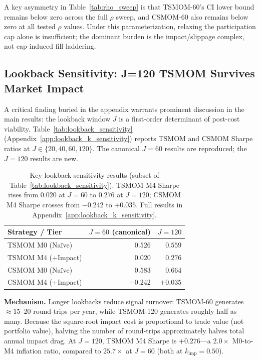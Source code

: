 \documentclass[12pt]{article}
\newcommand{\kimp}{k_{\mathrm{imp}}}
\begin{document}
A key asymmetry in Table~\ref{tab:rho_sweep} is that TSMOM-60's CI
lower bound remains below zero across the full $\rho$ sweep, and CSMOM-60
also remains below zero at all tested $\rho$ values. Under this
parameterization, relaxing the participation cap alone is insufficient;
the dominant burden is the impact/slippage complex, not cap-induced
fill laddering.

\subsection{Lookback Sensitivity: J=120 TSMOM Survives Market Impact}
\label{sec:lookback_main}

A critical finding buried in the appendix warrants prominent discussion
in the main results: the lookback window $J$ is a first-order determinant
of post-cost viability.
Table~\ref{tab:lookback_sensitivity} (Appendix~\ref{app:lookback_k_sensitivity})
reports TSMOM and CSMOM Sharpe ratios at $J \in \{20, 40, 60, 120\}$.
The canonical $J=60$ results are reproduced; the $J=120$ results are new.

\begin{table}[H]
\centering
\caption{Key lookback sensitivity results (subset of
Table~\ref{tab:lookback_sensitivity}). TSMOM M4 Sharpe rises from
$0.020$ at $J=60$ to $\mathbf{0.276}$ at $J=120$; CSMOM M4 Sharpe
crosses from $-0.242$ to $+0.035$. Full results in
Appendix~\ref{app:lookback_k_sensitivity}.}
\label{tab:lookback_main}
\small
\begin{tabular}{lrr}
\toprule
Strategy / Tier & $J = 60$ (canonical) & $J = 120$ \\
\midrule
TSMOM M0 (Na\"{i}ve)  & $0.526$ & $0.559$ \\
TSMOM M4 (+Impact)    & $0.020$ & $\mathbf{0.276}$ \\
\midrule
CSMOM M0 (Na\"{i}ve)  & $0.583$ & $0.664$ \\
CSMOM M4 (+Impact)    & $-0.242$ & $+0.035$ \\
\bottomrule
\end{tabular}
\end{table}

\noindent\textbf{Mechanism.}
Longer lookbacks reduce signal turnover: TSMOM-60 generates
$\approx 15$--20 round-trips per year, while TSMOM-120 generates
roughly half as many. Because the square-root impact cost is
proportional to trade value (not portfolio value), halving the number
of round-trips approximately halves total annual impact drag. At
$J=120$, TSMOM M4 Sharpe is $+0.276$---a $2.0\times$ M0-to-M4
inflation ratio, compared to $25.7\times$ at $J=60$
(both at $\kimp=0.50$).
\end{document}

